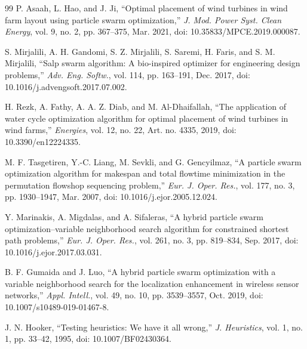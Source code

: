 {\begin{thebibliography}{99}
P. Asaah, L. Hao, and J. Ji, ``Optimal placement of wind turbines in wind farm layout using particle swarm optimization,'' \textit{J. Mod. Power Syst. Clean Energy}, vol. 9, no. 2, pp. 367--375, Mar. 2021, doi: 10.35833/MPCE.2019.000087.

S. Mirjalili, A. H. Gandomi, S. Z. Mirjalili, S. Saremi, H. Faris, and S. M. Mirjalili, ``Salp swarm algorithm: A bio-inspired optimizer for engineering design problems,'' \textit{Adv. Eng. Softw.}, vol. 114, pp. 163--191, Dec. 2017, doi: 10.1016/j.advengsoft.2017.07.002.

H. Rezk, A. Fathy, A. A. Z. Diab, and M. Al-Dhaifallah, ``The application of water cycle optimization algorithm for optimal placement of wind turbines in wind farms,'' \textit{Energies}, vol. 12, no. 22, Art. no. 4335, 2019, doi: 10.3390/en12224335.

M. F. Tasgetiren, Y.-C. Liang, M. Sevkli, and G. Gencyilmaz, ``A particle swarm optimization algorithm for makespan and total flowtime minimization in the permutation flowshop sequencing problem,'' \textit{Eur. J. Oper. Res.}, vol. 177, no. 3, pp. 1930--1947, Mar. 2007, doi: 10.1016/j.ejor.2005.12.024.

Y. Marinakis, A. Migdalas, and A. Sifaleras, ``A hybrid particle swarm optimization--variable neighborhood search algorithm for constrained shortest path problems,'' \textit{Eur. J. Oper. Res.}, vol. 261, no. 3, pp. 819--834, Sep. 2017, doi: 10.1016/j.ejor.2017.03.031.

B. F. Gumaida and J. Luo, ``A hybrid particle swarm optimization with a variable neighborhood search for the localization enhancement in wireless sensor networks,'' \textit{Appl. Intell.}, vol. 49, no. 10, pp. 3539--3557, Oct. 2019, doi: 10.1007/s10489-019-01467-8.

J. N. Hooker, ``Testing heuristics: We have it all wrong,'' \textit{J. Heuristics}, vol. 1, no. 1, pp. 33--42, 1995, doi: 10.1007/BF02430364.


\end{thebibliography}}
